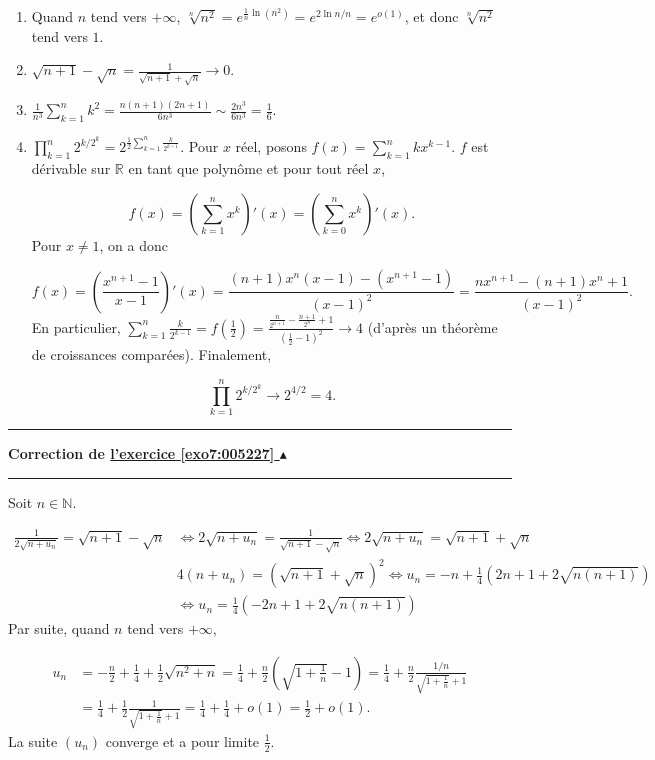 \documentclass[11pt,a4paper]{article}
\newcommand{\Nn}{\mathbb{N}} \newcommand{\N}{\mathbb{N}}
\newcommand{\Rr}{\mathbb{R}} \newcommand{\R}{\mathbb{R}}
\newcounter{exo}
\newcommand{\correction}[1]{\hypertarget{cor7:#1}{}\label{cor7:#1}{\bf Correction de \hyperlink{exo7:#1}{l'exercice \ref{exo7:#1} $\blacktriangle$}}\vspace{1mm}\hrule\vspace{1mm}}
\newcommand{\fincorrection}{\vspace{1mm}\hrule\vspace*{7mm}}
\begin{document}
\begin{enumerate}
\begin{center}
\end{center}

 \item  Quand $n$ tend vers $+\infty$, $\sqrt[n]{n^2}=e^{\frac{1}{n}\ln(n^2)}=e^{2\ln n/n}=e^{o(1)}$, et donc $\sqrt[n]{n^2}$ tend vers $1$.

\begin{center}
\end{center}
 \item  $\sqrt{n+1}-\sqrt{n}=\frac{1}{\sqrt{n+1}+\sqrt{n}}\rightarrow0$.
 \item  $\frac{1}{n^3}\sum_{k=1}^{n}k^2=\frac{n(n+1)(2n+1)}{6n^3}\sim\frac{2n^3}{6n^3}=\frac{1}{6}$.
 \item  $\prod_{k=1}^{n}2^{k/2^k}=2^{\frac{1}{2}\sum_{k=1}^{n}\frac{k}{2^{k-1}}}$. Pour $x$ réel, posons $f(x)=\sum_{k=1}^{n}kx^{k-1}$. $f$ est dérivable sur $\Rr$ en tant que polynôme et pour tout réel $x$, 

$$f(x)=\left(\sum_{k=1}^{n}x^k\right)'(x)=\left(\sum_{k=0}^{n}x^k\right)'(x).$$
Pour $x\neq1$, on a donc 

$$f(x)=\left(\frac{x^{n+1}-1}{x-1}\right)'(x)=\frac{(n+1)x^n(x-1)-(x^{n+1}-1)}{(x-1)^2}=\frac{nx^{n+1}-(n+1)x^n+1}{(x-1)^2}.$$
En particulier, $\sum_{k=1}^{n}\frac{k}{2^{k-1}}=f\left(\frac{1}{2}\right)=\frac{\frac{n}{2^{n+1}}-\frac{n+1}{2^n}+1}{(\frac{1}{2}-1)^2}
\rightarrow4$ (d'après un théorème de croissances comparées). Finalement,

$$\prod_{k=1}^{n}2^{k/2^k}\rightarrow2^{4/2}=4.$$
\end{enumerate}
\fincorrection
\correction{005227}
Soit $n\in\Nn$.

\begin{align*}
\frac{1}{2\sqrt{n+u_n}}=\sqrt{n+1}-\sqrt{n}&\Leftrightarrow 2\sqrt{n+u_n}=\frac{1}{\sqrt{n+1}-\sqrt{n}}\Leftrightarrow2\sqrt{n+u_n}=\sqrt{n+1}+\sqrt{n}\\
 &4(n+u_n)=(\sqrt{n+1}+\sqrt{n})^2\Leftrightarrow u_n=-n+\frac{1}{4}(2n+1+2\sqrt{n(n+1)})\\
 &\Leftrightarrow u_n=\frac{1}{4}(-2n+1+2\sqrt{n(n+1)})
\end{align*}
Par suite, quand $n$ tend vers $+\infty$,

\begin{align*}
u_n&=-\frac{n}{2}+\frac{1}{4}+\frac{1}{2}\sqrt{n^2+n}=
\frac{1}{4}+\frac{n}{2}\left(\sqrt{1+\frac{1}{n}}-1\right)=\frac{1}{4}+\frac{n}{2}\frac{1/n}{\sqrt{1+\frac{1}{n}}+1}\\
 &=
\frac{1}{4}+\frac{1}{2}\frac{1}{\sqrt{1+\frac{1}{n}}+1}=\frac{1}{4}+\frac{1}{4}+o(1)=\frac{1}{2}+o(1).
\end{align*}
La suite $(u_n)$ converge et a pour limite $\frac{1}{2}$.
\end{document}
